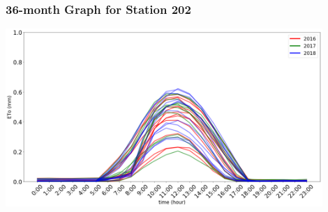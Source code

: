 \begin{frame}
\frametitle{36-month Graph for Station 202}
\centering
\includegraphics[width=0.9\textwidth]{images/202multi.png}
\end{frame}

